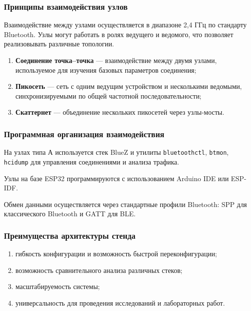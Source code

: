 \subsubsection{Принципы взаимодействия узлов}

Взаимодействие между узлами осуществляется
в диапазоне 2{,}4 ГГц по стандарту Bluetooth.
Узлы могут работать в ролях ведущего и ведомого,
что позволяет реализовывать различные топологии.

\begin{enumerate}[nosep]
    \item \textbf{Соединение точка--точка} ---
    взаимодействие между двумя узлами,
    используемое для изучения базовых параметров соединения;

    \item \textbf{Пикосеть} ---
    сеть с одним ведущим устройством
    и несколькими ведомыми,
    синхронизируемыми по общей частотной последовательности;

    \item \textbf{Скаттернет} ---
    объединение нескольких пикосетей через узлы-мосты.
\end{enumerate}


\subsubsection{Программная организация взаимодействия}

На узлах типа А используется стек BlueZ
и утилиты \texttt{bluetoothctl}, \texttt{btmon}, \texttt{hcidump}
для управления соединениями и анализа трафика.

Узлы на базе ESP32 программируются
с использованием Arduino IDE или ESP-IDF.

Обмен данными осуществляется через стандартные профили Bluetooth:
SPP для классического Bluetooth и GATT для BLE.

\subsubsection{Преимущества архитектуры стенда}

\begin{enumerate}[nosep]
    \item гибкость конфигурации
    и возможность быстрой переконфигурации;

    \item возможность сравнительного анализа различных стеков;

    \item масштабируемость системы;

    \item универсальность для проведения исследований и лабораторных работ.
\end{enumerate}

